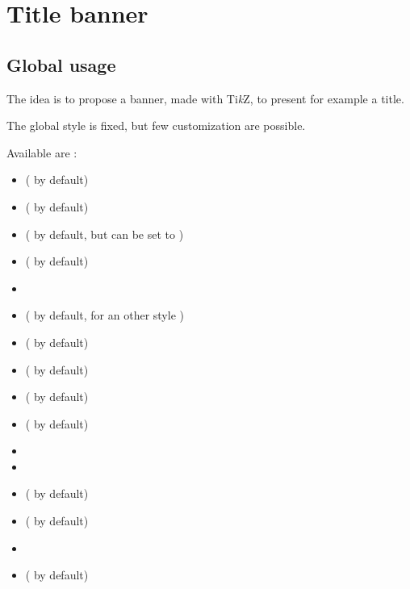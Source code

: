 \documentclass[english,11pt,a4paper]{article}
\providecommand\tikzlogo{Ti\textit{k}Z}
\let\TikZ\tikzlogo
\begin{document}
\pagebreak

\section{Title banner}

\subsection{Global usage}

The idea is to propose a banner, made with \TikZ, to present for example a title.

The global style is fixed, but few customization are possible.

\begin{codehigh}[language=latex/latex3,style/main=teal!25,style/code=teal!25]
\end{codehigh}

\begin{demohigh}[language=latex/latex3,style/main=teal!25,style/code=teal!25]
\end{demohigh}

Available  are :

\begin{itemize}
	\item {} (\MontreCode{2.5em} by default)
	\item {} ( by default)
	\item {} (\MontreCode{2.75em} by default, but can be set to )
	\item {} ( by default)
	\item {}
	\item {} ( by default, for an other style )
	\item {} ( by default)
	\item {} ( by default)
	\item {} ( by default)
	\item {} ( by default)
	\item {}
	\item {}
	\item {} ( by default)
	\item {} (  by default)
	\item {}
	\item {} ( by default)
\end{itemize}
\end{document}
